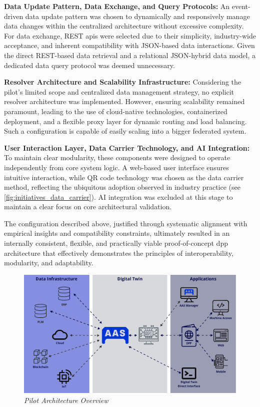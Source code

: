 \textbf{Data Update Pattern, Data Exchange, and Query Protocols:}
An event-driven data update pattern was chosen to dynamically and responsively manage data changes within the centralized architecture without excessive complexity. For data exchange, REST \ac{api}s were selected due to their simplicity, industry-wide acceptance, and inherent compatibility with JSON-based data interactions. Given the direct REST-based data retrieval and a relational JSON-hybrid data model, a dedicated data query protocol was deemed unnecessary.

\textbf{Resolver Architecture and Scalability Infrastructure:}
Considering the pilot's limited scope and centralized data management strategy, no explicit resolver architecture was implemented. However, ensuring scalability remained paramount, leading to the use of cloud-native technologies, containerized deployment, and a flexible proxy layer for dynamic routing and load balancing. Such a configuration is capable of easily scaling into a bigger federated system.

\textbf{User Interaction Layer, Data Carrier Technology, and AI Integration:}
To maintain clear modularity, these components were designed to operate independently from core system logic. A web-based user interface ensures intuitive interaction, while QR code technology was chosen as the data carrier method, reflecting the ubiquitous adoption observed in industry practice (see \cref{fig:initiatives_data_carrier}). AI integration was excluded at this stage to maintain a clear focus on core architectural validation.

The configuration described above, justified through systematic alignment with empirical insights and compatibility constraints, ultimately resulted in an internally consistent, flexible, and practically viable proof-of-concept \ac{dpp} architecture that effectively demonstrates the principles of interoperability, modularity, and adaptability.

\begin{figure}[htbp]
  \centering
  \includegraphics[width=\textwidth]{figures/pilot_architecture_global.pdf}
  \caption{%
    \textit{Pilot Architecture Overview} 
  }
  \label{fig:pilot_architecture_global}
\end{figure}

